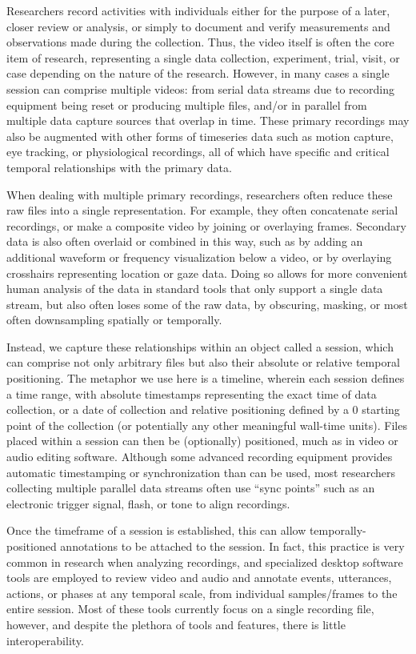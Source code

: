 \documentclass{sig-alternate}
\begin{document}
Researchers record activities with individuals either for the purpose of a later, closer review or analysis, or simply to document and verify measurements and observations made during the collection.
Thus, the video itself is often the core item of research, representing a single data collection, experiment, trial, visit, or case depending on the nature of the research.
However, in many cases a single session can comprise multiple videos: from serial data streams due to recording equipment being reset or producing multiple files, and/or in parallel from multiple data capture sources that overlap in time.
These primary recordings may also be augmented with other forms of timeseries data such as motion capture, eye tracking, or physiological recordings, all of which have specific and critical temporal relationships with the primary data.

When dealing with multiple primary recordings, researchers often reduce these raw files into a single representation.
For example, they often concatenate serial recordings, or make a composite video by joining or overlaying frames.
Secondary data is also often overlaid or combined in this way, such as by adding an additional waveform or frequency visualization below a video, or by overlaying crosshairs representing location or gaze data.
Doing so allows for more convenient human analysis of the data in standard tools that only support a single data stream, but also often loses some of the raw data, by obscuring, masking, or most often downsampling spatially or temporally.

Instead, we capture these relationships within an object called a session, which can comprise not only arbitrary files but also their absolute or relative temporal positioning.
The metaphor we use here is a timeline, wherein each session defines a time range, with absolute timestamps representing the exact time of data collection, or a date of collection and relative positioning defined by a 0 starting point of the collection (or potentially any other meaningful wall-time units).
Files placed within a session can then be (optionally) positioned, much as in video or audio editing software.
Although some advanced recording equipment provides automatic timestamping or synchronization than can be used, most researchers collecting multiple parallel data streams often use ``sync points'' such as an electronic trigger signal, flash, or tone to align recordings.

Once the timeframe of a session is established, this can allow temporally-positioned annotations to be attached to the session.
In fact, this practice is very common in research when analyzing recordings, and specialized desktop software tools are employed to review video and audio and annotate events, utterances, actions, or phases at any temporal scale, from individual samples/frames to the entire session.
Most of these tools currently focus on a single recording file, however, and despite the plethora of tools and features, there is little interoperability.
\end{document}
